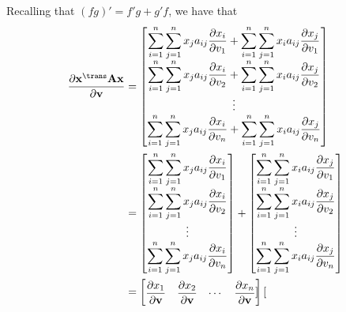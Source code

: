Recalling that \((fg)' = f'g + g'f\), we have that
\begin{align}
    \dfrac{\partial \mathbf{x}^\trans \mathbf{A} \mathbf{x}}{\partial \mathbf{v}} &= \begin{bmatrix}
        \displaystyle \sum_{i = 1}^{n}\sum_{j = 1}^{n} x_{j}a_{ij} \dfrac{\partial x_{i}}{\partial v_1} +
        \sum_{i = 1}^{n}\sum_{j = 1}^{n} x_{i}a_{ij} \dfrac{\partial x_{j}}{\partial v_1} \\ 
        \displaystyle \sum_{i = 1}^{n}\sum_{j = 1}^{n} x_{j}a_{ij} \dfrac{\partial x_{i}}{\partial v_2} +
        \sum_{i = 1}^{n}\sum_{j = 1}^{n} x_{i}a_{ij} \dfrac{\partial x_{j}}{\partial v_2} \\ 
        \vdots \\ 
        \displaystyle \sum_{i = 1}^{n}\sum_{j = 1}^{n} x_{j}a_{ij} \dfrac{\partial x_{i}}{\partial v_n} +
        \sum_{i = 1}^{n}\sum_{j = 1}^{n} x_{i}a_{ij} \dfrac{\partial x_{j}}{\partial v_n} 
    \end{bmatrix} \\
    &= \begin{bmatrix}
        \displaystyle \sum_{i = 1}^{n}\sum_{j = 1}^{n} x_{j}a_{ij} \dfrac{\partial x_{i}}{\partial v_1} \\
        \displaystyle \sum_{i = 1}^{n}\sum_{j = 1}^{n} x_{j}a_{ij} \dfrac{\partial x_{i}}{\partial v_2} \\
        \vdots \\ 
        \displaystyle \sum_{i = 1}^{n}\sum_{j = 1}^{n} x_{j}a_{ij} \dfrac{\partial x_{i}}{\partial v_n}
    \end{bmatrix} +
    \begin{bmatrix}
        \displaystyle \sum_{i = 1}^{n}\sum_{j = 1}^{n} x_{i}a_{ij} \dfrac{\partial x_{j}}{\partial v_1} \\ 
        \displaystyle \sum_{i = 1}^{n}\sum_{j = 1}^{n} x_{i}a_{ij} \dfrac{\partial x_{j}}{\partial v_2} \\ 
        \vdots \\ 
        \displaystyle \sum_{i = 1}^{n}\sum_{j = 1}^{n} x_{i}a_{ij} \dfrac{\partial x_{j}}{\partial v_n} 
    \end{bmatrix} \\
    &= \begin{bmatrix}
       \dfrac{\partial x_{1}}{\partial \mathbf{v}} & \dfrac{\partial x_{2}}{\partial \mathbf{v}} & \cdots  & \dfrac{\partial x_{n}}{\partial \mathbf{v}}
    \end{bmatrix}
    \begin{bmatrix}

\end{bmatrix}
\end{align}
